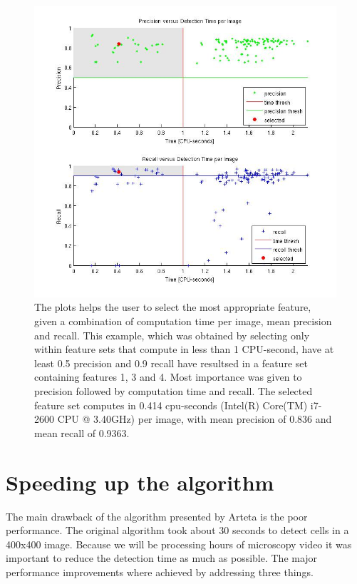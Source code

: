 	\begin{figure}
		  \includegraphics[width=\textwidth]{images/best_features}
		\caption{The plots helps the user to select the most appropriate feature, given a combination of computation time per image, mean precision and recall. This example, which was obtained by selecting only within feature sets that compute in less than 1 CPU-second, have at least 0.5 precision and 0.9 recall have resultsed in a feature set containing features 1, 3 and 4. Most importance was given to precision followed by computation time and recall. The selected feature set computes in 0.414 cpu-seconds (Intel(R) Core(TM) i7-2600 CPU @ 3.40GHz) per image, with mean precision of 0.836 and mean recall of 0.9363.}
	    \label{fig:bestFeatureSelector}
	\end{figure}
	
	\section{Speeding up the algorithm }
	\label{sec:detector_changes}
		The main drawback of the algorithm presented by Arteta \cite{arteta12} is the poor performance. The original algorithm took about 30 seconds to detect cells in a 400x400 image. Because we will be processing hours of microscopy video it was important to reduce the detection time as much as possible.  The major performance improvements where achieved by addressing three things.
		
